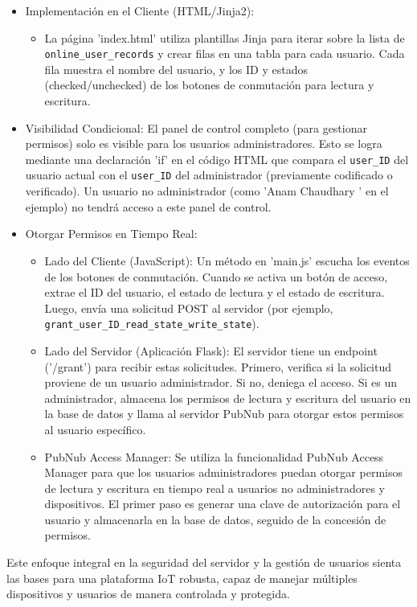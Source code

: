 \documentclass{report}
\begin{document}
\begin{itemize}
\begin{itemize}
        \item Implementación en el Cliente (HTML/Jinja2):
        \begin{itemize}
            \item La página 'index.html' utiliza plantillas Jinja para iterar sobre la lista de \verb|online_user_records| y crear filas en una 
            tabla para cada usuario. Cada fila muestra el nombre del usuario, y los ID y estados (checked/unchecked) de los botones de conmutación 
            para lectura y escritura.
        \end{itemize}
        \item Visibilidad Condicional: El panel de control completo (para gestionar permisos)  solo es visible para los usuarios administradores. 
        Esto se logra mediante una declaración 'if' en el código HTML que compara el \verb|user_ID| del usuario actual con el \verb|user_ID| 
        del administrador (previamente codificado o verificado). Un usuario no administrador (como  'Anam Chaudhary ' en el ejemplo) no tendrá 
        acceso a este panel de control.
        
        \item Otorgar Permisos en Tiempo Real: 
        \begin{itemize}
            \item Lado del Cliente (JavaScript): Un método en 'main.js' escucha los eventos de los botones de conmutación. Cuando se activa un 
            botón de acceso, extrae el ID del usuario, el estado de lectura y el estado de escritura. Luego, envía una solicitud POST al servidor 
            (por ejemplo, \verb|grant_user_ID_read_state_write_state|).
            \item Lado del Servidor (Aplicación Flask): El servidor tiene un endpoint ('/grant') para recibir estas solicitudes. Primero, verifica 
            si la solicitud proviene de un usuario administrador. Si no, deniega el acceso. Si es un administrador, almacena los permisos de lectura 
            y escritura del usuario en la base de datos y llama al servidor PubNub para otorgar estos permisos al usuario específico.
            \item PubNub Access Manager: Se utiliza la funcionalidad  PubNub Access Manager  para que los usuarios administradores puedan otorgar 
            permisos de lectura y escritura en tiempo real a usuarios no administradores y dispositivos. El primer paso es generar una clave de 
            autorización para el usuario y almacenarla en la base de datos, seguido de la concesión de permisos.
        \end{itemize}
    \end{itemize}
\end{itemize}
Este enfoque integral en la seguridad del servidor y la gestión de usuarios sienta las bases para una plataforma IoT robusta, 
capaz de manejar múltiples dispositivos y usuarios de manera controlada y protegida.
\end{document}
